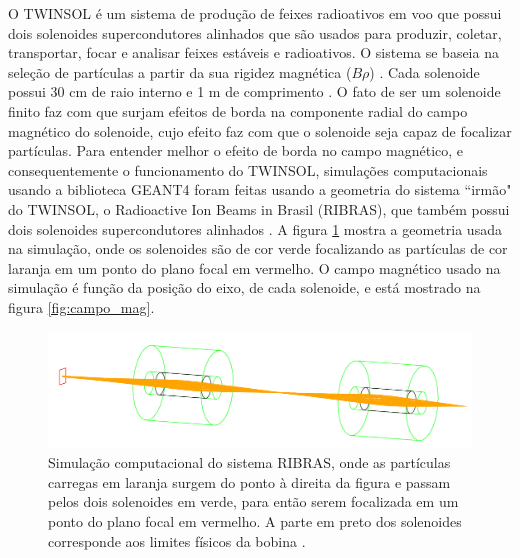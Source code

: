 \documentclass[a4paper,12pt,oneside]{book}
\begin{document}
\par O TWINSOL é um sistema de produção de feixes radioativos em voo que possui dois solenoides supercondutores alinhados que são usados para produzir, coletar, transportar, focar e analisar feixes estáveis e radioativos. O sistema se baseia na seleção de partículas a partir da sua rigidez magnética ($B\rho$) \cite{twinsol, ribras_leo, zamora_mater}. Cada solenoide possui 30 cm de raio interno e 1 m de comprimento \cite{twinsol}. O fato de ser um solenoide finito faz com que surjam efeitos de borda na componente radial do campo magnético do solenoide, cujo efeito faz com que o solenoide seja capaz de focalizar partículas. Para entender melhor o efeito de borda no campo magnético, e consequentemente o funcionamento do TWINSOL, simulações computacionais usando a biblioteca GEANT4 \cite{geant4} foram feitas usando a geometria do sistema ``irmão" do TWINSOL, o Radioactive Ion Beams in Brasil (RIBRAS), que também possui dois solenoides supercondutores alinhados \cite{ribras_leo, ribras}. A figura \ref{fig:sim_ribras} mostra a geometria usada na simulação, onde os solenoides são de cor verde focalizando as partículas de cor laranja em um ponto do plano focal em vermelho. O campo magnético usado na simulação é função da posição do eixo, de cada solenoide, e está mostrado na figura \ref{fig:campo_mag}.



\begin{figure}[H]
    \centering
    \includegraphics[scale = 0.95]{figs/Foco2S.png}
    \caption{Simulação computacional do sistema RIBRAS, onde as partículas carregas em laranja surgem do ponto à direita da figura e passam pelos dois solenoides em verde, para então serem focalizada em um ponto do plano focal em vermelho. A parte em preto dos solenoides corresponde aos limites físicos da bobina \cite{ribras_leo}.}
    \label{fig:sim_ribras}
\end{figure}
\end{document}

